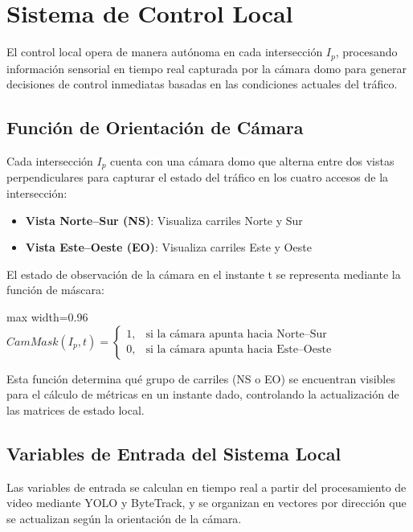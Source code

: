 \documentclass[12pt,a4paper,oneside]{report}
\newenvironment{centeredmath}
  {\begin{center}\begin{adjustbox}{max width=0.96\linewidth}\(\displaystyle}
  {\)\end{adjustbox}\end{center}}
\begin{document}
\section{Sistema de Control Local}\label{sistema-de-control-local}

El control local opera de manera autónoma en cada intersección \(I_{p}\), procesando información sensorial en tiempo real capturada por la cámara domo para generar decisiones de control inmediatas basadas en las condiciones actuales del tráfico.

\subsection{Función de Orientación de Cámara}\label{funciuxf3n-de-orientaciuxf3n-de-cuxe1mara}

Cada intersección \(I_{p}\) cuenta con una cámara domo que alterna entre dos vistas perpendiculares para capturar el estado del tráfico en los cuatro accesos de la intersección:

\begin{itemize}
\item
  \textbf{Vista Norte--Sur (NS)}: Visualiza carriles Norte y Sur
\item
  \textbf{Vista Este--Oeste (EO)}: Visualiza carriles Este y Oeste
\end{itemize}

El estado de observación de la cámara en el instante t se representa mediante la función de máscara:

\begin{centeredmath}
CamMask(I_{p},t) =
\begin{cases}
1, & \text{si la cámara apunta hacia Norte--Sur}\\[2pt]
0, & \text{si la cámara apunta hacia Este--Oeste}
\end{cases}
\end{centeredmath}

Esta función determina qué grupo de carriles (NS o EO) se encuentran visibles para el cálculo de métricas en un instante dado, controlando la actualización de las matrices de estado local.

\subsection{Variables de Entrada del Sistema Local}\label{variables-de-entrada-del-sistema-local}

Las variables de entrada se calculan en tiempo real a partir del procesamiento de video mediante YOLO y ByteTrack, y se organizan en vectores por dirección que se actualizan según la orientación de la cámara.
\end{document}
